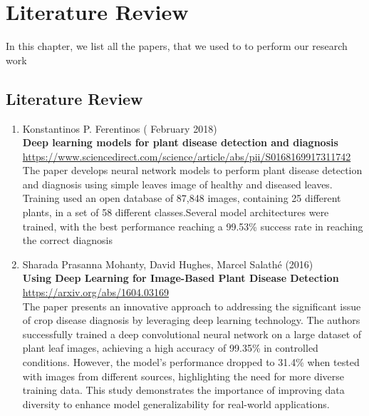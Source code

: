 \chapter{Literature Review}

In this chapter, we list all the papers, that we used to to perform our research work \par\vspace{1em}

\section{Literature Review}

\begin{enumerate}
    \item Konstantinos P. Ferentinos ( February 2018) \\
        \textbf{Deep learning models for plant disease detection and diagnosis} \\
        \href{https://www.sciencedirect.com/science/article/abs/pii/S0168169917311742}{https://www.sciencedirect.com/science/article/abs/pii/S0168169917311742} \\
         The paper develops neural network models to perform plant disease detection and diagnosis using simple leaves image of healthy and diseased leaves. Training used an open database of 87,848 images, containing 25 different plants, in a set of 58 different classes.Several model architectures were trained, with the best performance reaching a 99.53\% success rate in reaching the correct diagnosis
    
    \item Sharada Prasanna Mohanty, David Hughes, Marcel Salathé (2016) \\
        \textbf{Using Deep Learning for Image-Based Plant Disease Detection} \\
        \href{https://arxiv.org/abs/1604.03169}{https://arxiv.org/abs/1604.03169} \\
        The paper presents an innovative approach to addressing the significant issue of crop disease diagnosis by leveraging deep learning technology. The authors successfully trained a deep convolutional neural network on a large dataset of plant leaf images, achieving a high accuracy of 99.35\% in controlled conditions. However, the model's performance dropped to 31.4\% when tested with images from different sources, highlighting the need for more diverse training data. This study demonstrates the importance of improving data diversity to enhance model generalizability for real-world applications.
    

\end{enumerate}
